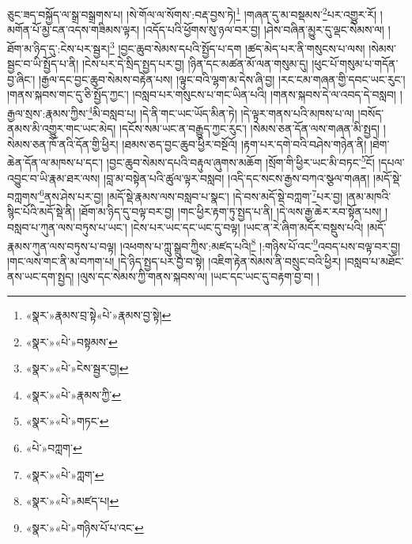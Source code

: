 ཅུང་ཟད་བསྐྱོད་ལ་སྒྲ་བསྒྲགས་པ། །སེ་གོལ་ལ་སོགས་:བརྡ་བྱས་ཏེ།\footnote{«སྣར་»རྣམས་བྲ་སྟེ«པེ་»རྣམས་བྱ་སྟེ།} །གཞན་དུ་མ་བསྡམས་\footnote{«སྣར་»«པེ་»བསྟམས་}པར་འགྱུར་རོ། །མགོན་པོ་མྱ་ངན་འདས་གཟིམས་ལྟར། །འདོད་པའི་ཕྱོགས་སུ་ཉལ་བར་བྱ། །ཤེས་བཞིན་མྱུར་དུ་ལྡང་སེམས་ལ། །ཐོག་མ་ཉིད་དུ་:ངེས་པར་སྦྱར།\footnote{«སྣར་»«པེ་»ངེས་སྦྱར་བྱ།} །བྱང་ཆུབ་སེམས་དཔའི་སྤྱོད་པ་དག །ཚད་མེད་པར་ནི་གསུངས་པ་ལས། །སེམས་སྦྱང་བ་ཡི་སྤྱོད་པ་ནི། །ངེས་པར་དེ་སྲིད་སྤྱད་པར་བྱ། །ཉིན་དང་མཚན་མོ་ལན་གསུམ་དུ། །ཕུང་པོ་གསུམ་པ་གདོན་བྱ་ཞིང་། །རྒྱལ་དང་བྱང་ཆུབ་སེམས་བརྟེན་པས། །ལྟུང་བའི་ལྷག་མ་དེས་ཞི་བྱ། །རང་ངམ་གཞན་གྱི་དབང་ཡང་རུང་། །གནས་སྐབས་གང་དུ་ཅི་སྤྱོད་ཀྱང་། །བསླབ་པར་གསུངས་པ་གང་ཡིན་པའི། །གནས་སྐབས་དེ་ལ་འབད་དེ་བསླབ། །རྒྱལ་སྲས་:རྣམས་ཀྱིས་\footnote{«སྣར་»«པེ་»རྣམས་ཀྱི་}མི་བསླབ་པ། །དེ་ནི་གང་ཡང་ཡོད་མིན་ཏེ། །དེ་ལྟར་གནས་པའི་མཁས་པ་ལ། །བསོད་ནམས་མི་འགྱུར་གང་ཡང་མེད། །དངོས་སམ་ཡང་ན་བརྒྱུད་ཀྱང་རུང་། །སེམས་ཅན་དོན་ལས་གཞན་མི་སྤྱད། །སེམས་ཅན་ཁོ་ནའི་དོན་གྱི་ཕྱིར། །ཐམས་ཅད་བྱང་ཆུབ་ཕྱིར་བསྔོའོ། །རྟག་པར་དགེ་བའི་བཤེས་གཉེན་ནི། །ཐེག་ཆེན་དོན་ལ་མཁས་པ་དང་། །བྱང་ཆུབ་སེམས་དཔའི་བརྟུལ་ཞུགས་མཆོག །སྲོག་གི་ཕྱིར་ཡང་མི་བཏང་\footnote{«སྣར་»«པེ་»གཏང་}ངོ། །དཔལ་འབྱུང་བ་ཡི་རྣམ་ཐར་ལས། །བླ་མ་བསྟེན་པའི་ཚུལ་ལྟར་བསླབ། །འདི་དང་སངས་རྒྱས་བཀའ་སྩལ་གཞན། །མདོ་སྡེ་བཀླགས་\footnote{«པེ་»བཀླག་}ནས་ཤེས་པར་བྱ། །མདོ་སྡེ་རྣམས་ལས་བསླབ་པ་སྣང་། །དེ་བས་མདོ་སྡེ་བཀླག་\footnote{«སྣར་»«པེ་»ཀླག་}པར་བྱ། །ནམ་མཁའི་སྙིང་པོའི་མདོ་སྡེ་ནི། །ཐོག་མ་ཉིད་དུ་བལྟ་བར་བྱ། །གང་ཕྱིར་རྟག་ཏུ་སྤྱད་པ་ནི། །དེ་ལས་རྒྱ་ཆེར་རབ་སྟོན་པས། །བསླབ་པ་ཀུན་ལས་བཏུས་པ་ཡང་། །ངེས་པར་ཡང་དང་ཡང་དུ་བལྟ། །ཡང་ན་རེ་ཞིག་མདོར་བསྡུས་པའི། །མདོ་རྣམས་ཀུན་ལས་བཏུས་པ་བལྟ། །འཕགས་པ་ཀླུ་སྒྲུབ་ཀྱིས་:མཛད་པའི།\footnote{«སྣར་»«པེ་»མཛད་པ།} །:གཉིས་པོ་འང་\footnote{«སྣར་»«པེ་»གཉིས་པོ་པ་འང་}འབད་པས་བལྟ་བར་བྱ། །གང་ལས་གང་ནི་མ་བཀག་པ། །དེ་ཉིད་སྤྱད་པར་བྱ་བ་སྟེ། །འཇིག་རྟེན་སེམས་ནི་བསྲུང་བའི་ཕྱིར། །བསླབ་པ་མཐོང་ནས་ཡང་དག་སྤྱད། །ལུས་དང་སེམས་ཀྱི་གནས་སྐབས་ལ། །ཡང་དང་ཡང་དུ་བརྟག་བྱ་བ། །
